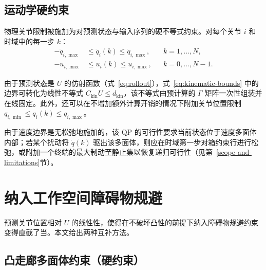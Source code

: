 \subsection{运动学硬约束}\label{c.-kinematic-hard-constraints}

物理关节限制被施加为对预测状态与输入序列的硬不等式约束。对每个关节 \(i\) 和时域中的每一步 \(k\)：
\begin{align}
\label{eq:kinematic-bounds}
-\dot{q}_{i,\max} &\leq \dot{q}_{i}(k) \leq \dot{q}_{i,\max},
&& k=1,\dots,N, \nonumber\\
-u_{i,\max} &\leq u_i(k) \leq u_{i,\max},
&& k=0,\dots,N-1 .
\end{align}

由于预测状态是 \(U\) 的仿射函数（式~\eqref{eq:rollout}），式~\eqref{eq:kinematic-bounds} 中的边界可转化为线性不等式 \(C_{\text{kin}} U \leq d_{\text{kin}}\)，该不等式由预计算的 \(\Gamma\) 矩阵一次性组装并在线固定。此外，还可以在不增加额外计算开销的情况下附加关节位置限制 \(q_{i,\min} \leq q_i(k) \leq q_{i,\max}\)。

由于速度边界是无松弛地施加的，该 QP 的可行性要求当前状态位于速度多面体内部；若某个扰动将 \(\dot q(k)\) 驱出该多面体，则应在时域第一步对箱约束行进行松弛，或附加一个终端的最大制动至静止集以恢复递归可行性（见第~\ref{scope-and-limitations}节）。

\section{纳入工作空间障碍物规避}\label{iv.-incorporating-workspace-obstacle-avoidance}

预测关节位置相对 \(U\) 的线性性，使得在不破坏凸性的前提下纳入障碍物规避约束变得直截了当。本文给出两种互补方法。

\subsection{凸走廊多面体约束（硬约束）}\label{a.-convex-corridor-polytope-constraints-hard-constraints}


